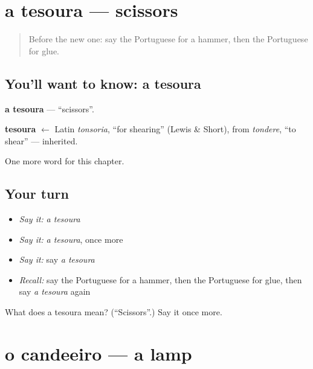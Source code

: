 \section[a tesoura]{a tesoura — scissors}

\label{lesson:PT-C98-tesoura}



\begin{quote}
Before the new one: say the Portuguese for a hammer, then the Portuguese for glue.
\end{quote}

\subsection*{You'll want to know: a tesoura}
\textbf{a tesoura} — \textquotedblleft{}scissors\textquotedblright{}.

\begin{cousinweb}
\textbf{tesoura} $\leftarrow$ Latin \emph{tonsoria}, \textquotedblleft{}for shearing\textquotedblright{} (Lewis \& Short), from \emph{tondere}, \textquotedblleft{}to shear\textquotedblright{} — inherited.
\end{cousinweb}

\begin{grammarlens}[title={What you've built}]
One more word for this chapter.
\end{grammarlens}

\subsection*{Your turn}
\begin{itemize}
\raggedright
  \item \emph{Say it:} \emph{a tesoura}
  \item \emph{Say it:} \emph{a tesoura}, once more
  \item \emph{Say it:} say \emph{a tesoura}
  \item \emph{Recall:} say the Portuguese for a hammer, then the Portuguese for glue, then say \emph{a tesoura} again
\end{itemize}

\begin{tcolorbox}[breakable,colback=teal!4,colframe=teal!35!black,title={Before you move on}]
What does a tesoura mean? (\textquotedblleft{}Scissors\textquotedblright{}.) Say it once more.
\end{tcolorbox}
\section[o candeeiro]{o candeeiro — a lamp}

